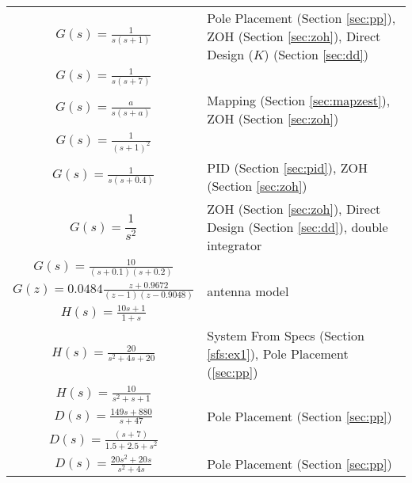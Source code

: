 \documentclass{article}
\begin{document}
{\tabulinesep=1.5mm
\begin{tabu}{|c|l|}
\hline
$\displaystyle G(s) = \frac{1}{s(s + 1)}$ & Pole Placement (Section \ref{sec:pp}), ZOH (Section \ref{sec:zoh}), Direct Design ($K$) (Section \ref{sec:dd}) \\
$\displaystyle G(s) = \frac{1}{s(s + 7)}$ & \\
$\displaystyle G(s) = \frac{a}{s(s + a)}$ & Mapping (Section \ref{sec:mapzest}), ZOH (Section \ref{sec:zoh}) \\
$\displaystyle G(s) = \frac{1}{(s + 1)^2}$ & \\
$\displaystyle G(s) = \frac{1}{s(s + 0.4)}$ & PID (Section \ref{sec:pid}), ZOH (Section \ref{sec:zoh}) \\
$\displaystyle G(s) = \dfrac{1}{s^2}$ & ZOH (Section \ref{sec:zoh}), Direct Design (Section \ref{sec:dd}), double integrator \\
$\displaystyle G(s) = \frac{10}{(s + 0.1)(s + 0.2)}$ & \\
$\displaystyle G(z) = 0.0484 \frac{z + 0.9672}{(z - 1)(z - 0.9048)}$ & antenna model\autocite[Pg. 261]{franklin1998digital} \\
\hline
$\displaystyle H(s) = \frac{10s + 1}{1 + s}$ & \\
$\displaystyle H(s) = \frac{20}{s^2 + 4s + 20}$ &  System From Specs (Section \ref{sfs:ex1}), Pole Placement (\ref{sec:pp}) \\
$\displaystyle H(s) = \frac{10}{s^2 + s + 1}$ & \\
\hline
$\displaystyle D(s) = \frac{149s + 880}{s + 47}$ & Pole Placement (Section \ref{sec:pp}) \\
$\displaystyle D(s) = \frac{(s + 7)}{1.5 + 2.5 + s^2}$ & \\
$\displaystyle D(s) = \frac{20s^2 + 20s}{s^2 + 4s}$ & Pole Placement (Section \ref{sec:pp}) \\
\hline
\end{tabu}}

\end{document}
